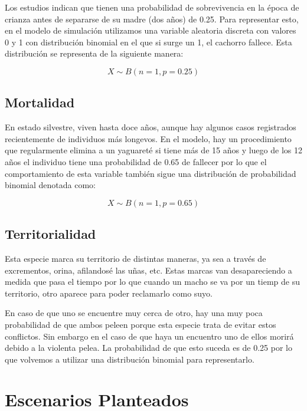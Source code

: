            Los estudios indican que tienen una probabilidad de sobrevivencia en la época de crianza antes de separarse de su madre (dos años) de 0.25. Para representar esto, en el modelo de simulación utilizamos una variable aleatoria discreta con valores 0 y 1 con distribución binomial en el que si surge un 1, el cachorro fallece. Esta distribución se representa de la siguiente manera:

            \begin{equation}
                X \sim B(n=1, p=0.25)
            \end{equation}
            
    \subsection{Mortalidad}
        En estado silvestre, viven hasta doce años, aunque hay algunos casos registrados recientemente de individuos más longevos. En el modelo, hay un procedimiento que regularmente elimina a un yaguareté si tiene más de 15 años y luego de los 12 años el individuo tiene una probabilidad de 0.65 de fallecer por lo que el comportamiento de esta variable también sigue una distribución de probabilidad binomial denotada como:
        
        \begin{equation}
            X \sim B(n=1, p=0.65)
        \end{equation}

    \subsection{Territorialidad}
        Esta especie marca su territorio de distintas maneras, ya sea a través de excrementos, orina, afilandosé las uñas, etc. Estas marcas van desapareciendo a medida que pasa el tiempo por lo que cuando un macho se va por un tiemp de su territorio, otro aparece para poder reclamarlo como suyo.
        
        En caso de que uno se encuentre muy cerca de otro, hay una muy poca probabilidad de que ambos peleen porque esta especie trata de evitar estos conflictos. Sin embargo en el caso de que haya un encuentro uno de ellos morirá debido a la violenta pelea.
        La probabilidad de que esto suceda es de 0.25 por lo que volvemos a utilizar una distribución binomial para representarlo.
        
\section{Escenarios Planteados}
